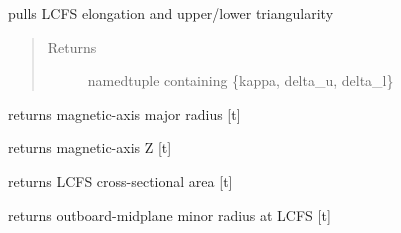 \documentclass[letterpaper,10pt,english]{sphinxmanual}
\begin{document}
\begin{fulllineitems}
\begin{fulllineitems}
\end{fulllineitems}


\begin{fulllineitems}
\label{eqtools:eqtools.EFIT.EFITTree.getSlhaping}
pulls LCFS elongation and upper/lower triangularity
\begin{quote}\begin{description}
\item[{Returns}] \leavevmode
namedtuple containing \{kappa, delta\_u, delta\_l\}

\end{description}\end{quote}

\end{fulllineitems}


\begin{fulllineitems}
\label{eqtools:eqtools.EFIT.EFITTree.getMagR}
returns magnetic-axis major radius {[}t{]}

\end{fulllineitems}


\begin{fulllineitems}
\label{eqtools:eqtools.EFIT.EFITTree.getMagZ}
returns magnetic-axis Z {[}t{]}

\end{fulllineitems}


\begin{fulllineitems}
\label{eqtools:eqtools.EFIT.EFITTree.getAreaLCFS}
returns LCFS cross-sectional area {[}t{]}

\end{fulllineitems}


\begin{fulllineitems}
\label{eqtools:eqtools.EFIT.EFITTree.getAOut}
returns outboard-midplane minor radius at LCFS {[}t{]}


\end{fulllineitems}
\end{fulllineitems}
\end{document}
